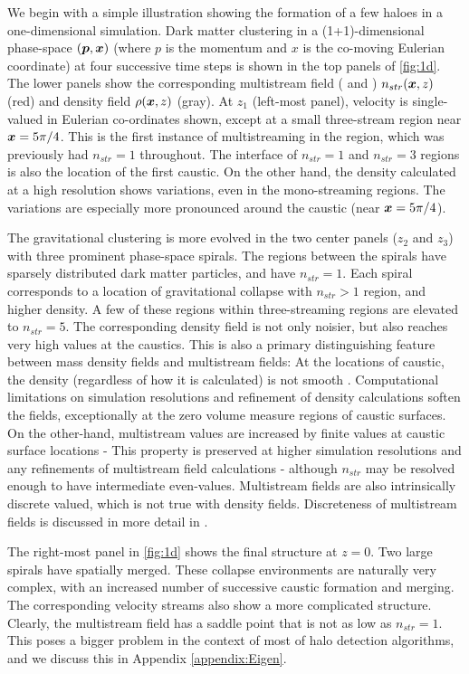 \documentclass[fleqn,usenatbib,useAMS]{mnras}
\begin{document}
We begin with a simple illustration showing the formation of a few haloes in a one-dimensional simulation. Dark matter clustering in a (1+1)-dimensional phase-space $(\bmath{p}, \bmath{x})$ (where $p$ is the momentum and $x$ is the co-moving Eulerian coordinate) at four successive time steps is shown in the top panels of \autoref{fig:1d}. The lower panels show the corresponding multistream field (\citealt{Shandarin2012} and \citealt{Abel2012}) $n_{str}(\bmath{x}, z)$ (red) and density field $\rho(\bmath{x}, z)$ (gray). At $z_1$ (left-most panel), velocity is single-valued in Eulerian co-ordinates shown, except at a small three-stream region near $\bmath{x} = 5\pi/4$. This is the first instance of multistreaming in the region, which was previously had $n_{str} = 1$ throughout. The interface of $n_{str} = 1$ and $n_{str} = 3$ regions is also the location of the first caustic. On the other hand, the density calculated at a high resolution shows variations, even in the mono-streaming regions. The variations are especially more pronounced around  the caustic (near $\bmath{x} = 5\pi/4$).


The gravitational clustering is more evolved in the two center panels ($z_2$ and $z_3$) with three prominent phase-space spirals. The regions between the spirals have sparsely distributed dark matter particles, and have $n_{str} = 1$. Each spiral corresponds to a location of gravitational collapse with $n_{str} > 1$ region, and higher density. A few of these regions within three-streaming regions are elevated to $n_{str} = 5$. The corresponding density field is not only noisier, but also reaches very high values at the caustics. This is also a primary distinguishing feature between mass density fields and multistream fields: At the locations of caustic, the density (regardless of how it is calculated) is not smooth \cite{Vogelsberger2011}. Computational limitations on simulation resolutions and refinement of density calculations soften the fields, exceptionally at the zero volume measure regions of caustic surfaces.  On the other-hand, multistream values are increased by finite values at caustic surface locations - This property is preserved at higher simulation resolutions and any refinements of multistream field calculations - although $n_{str}$ may be resolved enough to have intermediate even-values. Multistream fields are also intrinsically discrete valued, which is not true with density fields. Discreteness of multistream fields is discussed in more detail in \cite{Ramachandra2017}. 

The right-most panel in \autoref{fig:1d} shows the final structure at $z=0$. Two large spirals have spatially merged. These collapse environments are naturally very complex, with an increased number of successive caustic formation and merging. 
The corresponding velocity streams also show a more complicated structure. Clearly, the multistream field has a saddle point that is not as low as $n_{str} = 1$. This poses a bigger problem in the context of most of halo detection algorithms, and we discuss this in Appendix \ref{appendix:Eigen}. 
\end{document}
